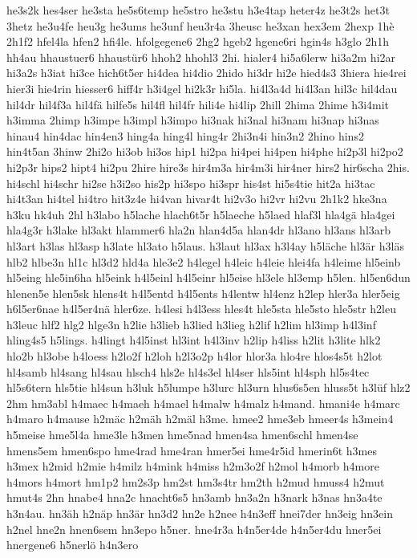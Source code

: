 {he3s2k
hes4ser
he3sta
he5s6temp
he5stro
he3stu
h3e4tap
heter4z
he3t2s
het3t
3hetz
he3u4fe
heu3g
he3ums
he3unf
heu3r4a
3heusc
he3xan
hex3em
2hexp
1hè
2h1f2
hfel4la
hfen2
hfi4le.
hfolgegene6
2hg2
hgeb2
hgene6ri
hgin4s
h3glo
2h1h
hh4au
hhaustuer6
hhaustür6
hhoh2
hhohl3
2hi.
hialer4
hi5a6lerw
hi3a2m
hi2ar
hi3a2s
h3iat
hi3ce
hich6t5er
hi4dea
hi4dio
2hido
hi3dr
hi2e
hied4s3
3hiera
hie4rei
hier3i
hie4rin
hiesser6
hiff4r
h3i4gel
hi2k3r
hi5la.
hi4l3a4d
hi4l3an
hil3c
hil4dau
hil4dr
hil4f3a
hil4fä
hilfe5s
hil4fl
hil4fr
hili4e
hi4lip
2hill
2hima
2hime
h3i4mit
h3imma
2himp
h3impe
h3impl
h3impo
hi3nak
hi3nal
hi3nam
hi3nap
hi3nas
hinau4
hin4dac
hin4en3
hing4a
hing4l
hing4r
2hi3n4i
hin3n2
2hino
hins2
hin4t5an
3hinw
2hi2o
hi3ob
hi3os
hip1
hi2pa
hi4pei
hi4pen
hi4phe
hi2p3l
hi2po2
hi2p3r
hips2
hipt4
hi2pu
2hire
hire3s
hir4m3a
hir4m3i
hir4ner
hirs2
hir6scha
2his.
hi4schl
hi4schr
hi2se
h3i2so
his2p
hi3spo
hi3spr
his4st
hi5s4tie
hit2a
hi3tac
hi4t3an
hi4tel
hi4tro
hit3z4e
hi4van
hivar4t
hi2v3o
hi2vr
hi2vu
2h1k2
hke3na
h3ku
hk4uh
2hl
h3labo
h5lache
hlach6t5r
h5laeche
h5laed
hlaf3l
hla4gä
hla4gei
hla4g3r
h3lake
hl3akt
hlammer6
hla2n
hlan4d5a
hlan4dr
hl3ano
hl3ans
hl3arb
hl3art
h3las
hl3asp
h3late
hl3ato
h5laus.
h3laut
hl3ax
h3l4ay
h5läche
hl3är
h3läs
hlb2
hlbe3n
hl1c
hl3d2
hld4a
hle3e2
h4legel
h4leic
h4leie
hlei4fa
h4leime
hl5einb
hl5eing
hle5in6ha
hl5eink
h4l5einl
h4l5einr
hl5eise
hl3ele
hl3emp
h5len.
hl5en6dun
hlenen5e
hlen5sk
hlens4t
h4l5entd
h4l5ents
h4lentw
hl4enz
h2lep
hler3a
hler5eig
h6l5er6nae
h4l5er4nä
hler6ze.
h4lesi
h4l3ess
hles4t
hle5sta
hle5sto
hle5str
h2leu
h3leuc
hlf2
hlg2
hlge3n
h2lie
h3lieb
h3lied
h3lieg
h2lif
h2lim
hl3imp
h4l3inf
hling4s5
h5lings.
h4lingt
h4l5inst
hl3int
h4l3inv
h2lip
h4liss
h2lit
h3lite
hlk2
hlo2b
hl3obe
h4loess
h2lo2f
h2loh
h2l3o2p
h4lor
hlor3a
hlo4re
hlos4s5t
h2lot
hl4samb
hl4sang
hl4sau
hlsch4
hls2e
hl4s3el
hl4ser
hls5int
hl4sph
hl5s4tec
hl5s6tern
hls5tie
hl4sun
h3luk
h5lumpe
h3lurc
hl3urn
hlus6s5en
hluss5t
h3lüf
hlz2
2hm
hm3abl
h4maec
h4maeh
h4mael
h4malw
h4malz
h4mand.
hmani4e
h4marc
h4maro
h4mause
h2mäc
h2mäh
h2mäl
h3me.
hmee2
hme3eb
hmeer4s
h3mein4
h5meise
hme5l4a
hme3le
h3men
hme5nad
hmen4sa
hmen6schl
hmen4se
hmens5em
hmen6spo
hme4rad
hme4ran
hmer5ei
hme4r5id
hmerin6t
h3mes
h3mex
h2mid
h2mie
h4milz
h4mink
h4miss
h2m3o2f
h2mol
h4morb
h4more
h4mors
h4mort
hm1p2
hm2s3p
hm2st
hm3s4tr
hm2th
h2mud
hmuss4
h2mut
hmut4s
2hn
hnabe4
hna2c
hnacht6s5
hn3amb
hn3a2n
h3nark
h3nas
hn3a4te
h3n4au.
hn3äh
h2näp
hn3är
hn3d2
hn2e
h2nee
h4n3eff
hnei7der
hn3eig
hn3ein
h2nel
hne2n
hnen6sem
hn3epo
h5ner.
hne4r3a
h4n5er4de
h4n5er4du
hner5ei
hnergene6
h5nerlö
h4n3ero
}
